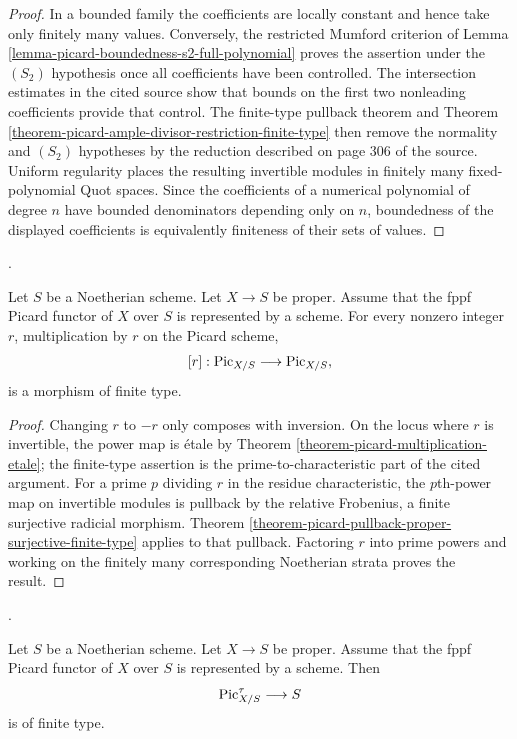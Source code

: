 \begin{proof}
In a bounded family the coefficients are locally constant and hence take
only finitely many values. Conversely, the restricted Mumford criterion of
Lemma \ref{lemma-picard-boundedness-s2-full-polynomial} proves the assertion
under the $(S_2)$ hypothesis once all coefficients have been controlled. The
intersection estimates in the cited source show that bounds on the first two
nonleading coefficients provide that control. The finite-type pullback
theorem and Theorem
\ref{theorem-picard-ample-divisor-restriction-finite-type} then remove the
normality and $(S_2)$ hypotheses by the reduction described on page 306 of the
source. Uniform regularity places the resulting invertible modules in
finitely many fixed-polynomial Quot spaces. Since the coefficients of a
numerical polynomial of degree $n$ have bounded denominators depending only
on $n$, boundedness of the displayed coefficients is equivalently finiteness
of their sets of values.
\end{proof}

\begin{theorem}
\label{theorem-picard-power-map-finite-type}
\begin{reference}
\cite[Supplement to Expos\'e 236, (iv), pp. 304 and 306]{FGA}.
\end{reference}
Let $S$ be a Noetherian scheme. Let $X \to S$ be proper. Assume that the fppf
Picard functor of $X$ over $S$ is represented by a scheme. For every nonzero
integer $r$, multiplication by $r$ on the Picard scheme,
$$
[r] : \mathrm{Pic}_{X/S} \longrightarrow \mathrm{Pic}_{X/S},
$$
is a morphism of finite type.
\end{theorem}

\begin{proof}
Changing $r$ to $-r$ only composes with inversion. On the locus where $r$ is
invertible, the power map is \'etale by Theorem
\ref{theorem-picard-multiplication-etale}; the finite-type assertion is the
prime-to-characteristic part of the cited argument. For a prime $p$ dividing
$r$ in the residue characteristic, the $p$th-power map on invertible modules
is pullback by the relative Frobenius, a finite surjective radicial
morphism. Theorem
\ref{theorem-picard-pullback-proper-surjective-finite-type} applies to that
pullback. Factoring $r$ into prime powers and working on the finitely many
corresponding Noetherian strata proves the result.
\end{proof}

\begin{theorem}
\label{theorem-picard-torsion-components-finite-type}
\begin{reference}
\cite[Supplement to Expos\'e 236, (v), p. 304]{FGA}.
\end{reference}
Let $S$ be a Noetherian scheme. Let $X \to S$ be proper. Assume that the fppf
Picard functor of $X$ over $S$ is represented by a scheme. Then
$$
\mathrm{Pic}_{X/S}^{\tau} \longrightarrow S
$$
is of finite type.
\end{theorem}

